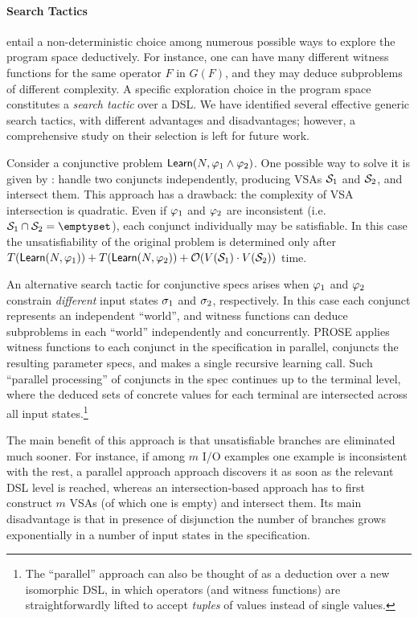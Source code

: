 \paragraph{Search Tactics}
 entail a non-deterministic choice among numerous possible ways
to explore the program space deductively.
For instance, one can have many different witness functions for the same operator $F$ in $G(F)$, and they may deduce subproblems of
different complexity.
A specific exploration choice in the program space constitutes a \emph{search tactic} over a DSL.
We have identified several effective generic search tactics, with different advantages and disadvantages;
however, a comprehensive study on their selection is left for future work.

Consider a conjunctive problem $\mathsf{Learn}(N, \varphi_1 \wedge \varphi_2)$.
One possible way to solve it is given by : handle two conjuncts independently, producing VSAs
$\mathcal{S}_1$ and $\mathcal{S}_2$, and intersect them.
This approach has a drawback: the complexity of VSA intersection is quadratic.
Even if $\varphi_1$ and $\varphi_2$ are inconsistent (i.e. $\vsa_1 \cap \vsa_2 = \emptyset$), each conjunct individually may
be satisfiable.
In this case the unsatisfiability of the original problem is determined only after $T(\mathsf{Learn}(N, \varphi_1)) +
T(\mathsf{Learn}(N, \varphi_2)) + \mathcal{O}(V(\mathcal{S}_1) \cdot V(\mathcal{S}_2))$ time.

An alternative search tactic for conjunctive specs arises when $\varphi_1$ and $\varphi_2$ constrain \emph{different} input
states $\sigma_1$ and $\sigma_2$, respectively.
In this case each conjunct represents an independent ``world'', and witness functions can deduce subproblems in each
``world'' independently and concurrently.
PROSE applies witness functions to each conjunct in the specification in parallel, conjuncts the resulting parameter
specs, and makes a single recursive learning call.
Such ``parallel processing'' of conjuncts in the spec continues up to the terminal level, where the deduced sets of
concrete values for each terminal are intersected across all input states.\footnote{
    The ``parallel'' approach can also be thought of as a deduction over a new isomorphic DSL,
    in which operators (and witness functions) are straightforwardly lifted to accept \emph{tuples} of values
    instead of single values.}

The main benefit of this approach is that unsatisfiable branches are eliminated much sooner.
For instance, if among $m$ I/O examples one example is inconsistent with the rest, a parallel approach
approach discovers it as soon as the relevant DSL level is reached, whereas an intersection-based approach has to first
construct $m$ VSAs (of which one is empty) and intersect them.
Its main disadvantage is that in presence of disjunction the number of branches grows exponentially in a number of input
states in the specification.

